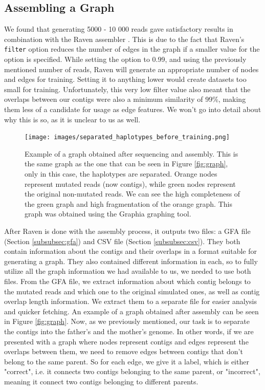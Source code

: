 \documentclass[times, utf8, diplomski, english]{fer_eng}
\begin{document}
\subsection{Assembling a Graph}
\label{subsec:assembling the graph}

We found that generating 5000 - 10 000 reads gave satisfactory results in combination with the Raven assembler \cite{Vaser}. This is due to the fact that Raven's \texttt{filter} option reduces the number of edges in the graph if a smaller value for the option is specified. While setting the option to 0.99, and using the previously mentioned number of reads, Raven will generate an appropriate number of nodes and edges for training. Setting it to anything lower would create datasets too small for training. Unfortunately, this very low filter value also meant that the overlaps between our contigs were also a minimum similarity of 99\%, making them less of a candidate for usage as edge features. We won't go into detail about why this is so, as it is unclear to us as well.

\begin{figure}[h]
	\centering
	\texttt{[image: images/separated\_haplotypes\_before\_training.png]}
	\caption[Separated graph]{Example of a graph obtained after sequencing and assembly. This is the same graph as the one that can be seen in Figure \ref{fig:graph}, only in this case, the haplotypes are separated. Orange nodes represent mutated reads (now contigs), while green nodes represent the original non-mutated reads. We can see the high completeness of the green graph and high fragmentation of the orange graph. This graph was obtained using the Graphia\footnotemark{} graphing tool.}
	\label{fig:separated graph}
\end{figure}

After Raven is done with the assembly process, it outputs two files: a GFA file (Section \ref{subsubsec:gfa}) and CSV file (Section \ref{subsubsec:csv}). They both contain information about the contigs and their overlaps in a format suitable for generating a graph. They also contained different information in each, so to fully utilize all the graph information we had available to us, we needed to use both files. From the GFA file, we extract information about which contig belongs to the mutated reads and which one to the original simulated ones, as well as contig overlap length information. We extract them to a separate file for easier analysis and quicker fetching. An example of a graph obtained after assembly can be seen in Figure \ref{fig:graph}. Now, as we previously mentioned, our task is to separate the contigs into the father's and the mother's genome. In other words, if we are presented with a graph where nodes represent contigs and edges represent the overlaps between them, we need to remove edges between contigs that don't belong to the same parent. So for each edge, we give it a label, which is either "correct", i.e. it connects two contigs belonging to the same parent, or "incorrect", meaning it connect two contigs belonging to different parents.
\end{document}
